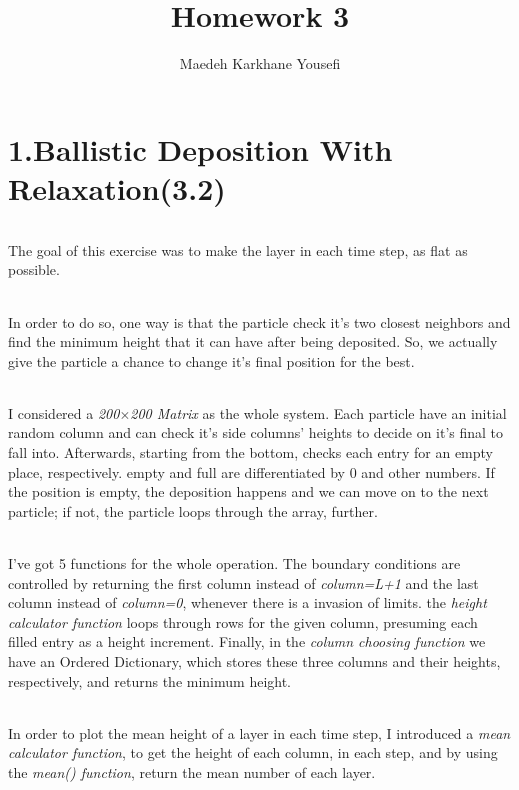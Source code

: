 \documentclass[12pt]{article}
\title{\textbf{Homework 3}}
\author{Maedeh Karkhane Yousefi}
\begin{document}
\maketitle
\part*{1.Ballistic Deposition With Relaxation(3.2)}
\paragraph*{}
The goal of this exercise was to make the layer in each time step, as flat as possible.
\paragraph*{}
In order to do so, one way is that the particle check it's two closest neighbors and find the minimum height that it can have after being deposited. So, we actually give the particle a chance to change it's final position for the best. 
\paragraph*{}
I considered a \textit{200$\times$200 Matrix} as the whole system. Each particle have an initial random column and can check it's side columns' heights to decide on it's final to fall into. Afterwards, starting from the bottom, checks each entry for an empty place, respectively. empty and full are differentiated by 0 and other numbers. If the position is empty, the deposition happens and we can move on to the next particle; if not, the particle loops through the array, further. 
\paragraph*{}
I've got 5 functions for the whole operation. The boundary conditions are controlled by returning the first column instead of \textit{column=L+1} and the last column instead of \textit{column=0}, whenever there is a invasion of limits. 
the \textit{height calculator function} loops through rows for the given column, presuming each filled entry as a height increment.
Finally, in the \textit{column choosing function} we have an Ordered Dictionary, which stores these three columns and their heights, respectively, and returns the minimum height. 
\paragraph*{} In order to plot the mean height of a layer in each time step, I introduced a \textit{mean calculator function}, to get the height of each column, in each step, and by using the \textit{mean() function}, return the mean number of each layer. 
\end{document}
